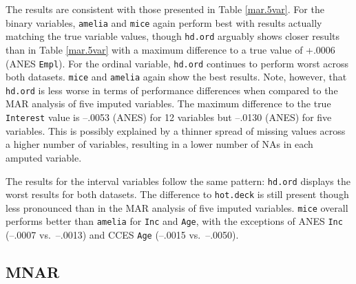 \documentclass[12pt,econ]{sources/authesis}
\begin{document}
\normalsize

The results are consistent with those presented in Table \ref{mar.5var}. For the binary variables, \texttt{amelia} and \texttt{mice} again perform best with results actually matching the true variable values, though \texttt{hd.ord} arguably shows closer results than in Table \ref{mar.5var} with a maximum difference to a true value of +.0006 (ANES \texttt{Empl}). For the ordinal variable, \texttt{hd.ord} continues to perform worst across both datasets. \texttt{mice} and \texttt{amelia} again show the best results. Note, however, that \texttt{hd.ord} is less worse in terms of performance differences when compared to the MAR analysis of five imputed variables. The maximum difference to the true \texttt{Interest} value is --.0053 (ANES) for 12 variables but --.0130 (ANES) for five variables. This is possibly explained by a thinner spread of missing values across a higher number of variables, resulting in a lower number of NAs in each amputed variable.

The results for the interval variables follow the same pattern: \texttt{hd.ord} displays the worst results for both datasets. The difference to \texttt{hot.deck} is still present though less pronounced than in the MAR analysis of five imputed variables. \texttt{mice} overall performs better than \texttt{amelia} for \texttt{Inc} and \texttt{Age}, with the exceptions of ANES \texttt{Inc} (--.0007 vs.~--.0013) and CCES \texttt{Age} (--.0015 vs.~--.0050).

\hypertarget{ordmiss-results-mnar}{%
\subsection{MNAR}\label{ordmiss-results-mnar}}
\end{document}
